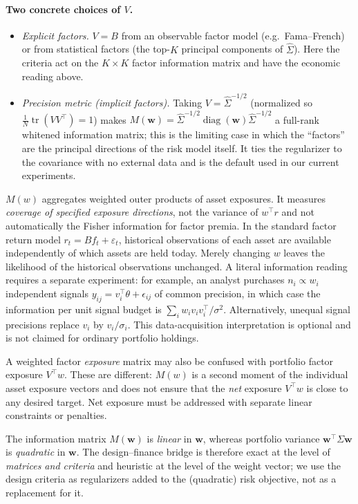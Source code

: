 \documentclass[11pt]{article}
\newcommand{\Sig}{\Sigma}
\newcommand{\Sighat}{\hat\Sigma}
\newcommand{\tr}{\operatorname{tr}}
\newcommand{\diag}{\operatorname{diag}}
\newcommand{\w}{\mathbf{w}}
\newcommand{\M}{M(\w)}
\begin{document}
\paragraph{Two concrete choices of $V$.}
\begin{itemize}[leftmargin=1.4em,itemsep=0.2em]
  \item \emph{Explicit factors.} $V=B$ from an observable factor model
    (e.g.\ Fama--French) or from statistical factors (the top-$K$ principal
    components of $\Sighat$). Here the criteria act on the $K\times K$ factor
    information matrix and have the economic reading above.
  \item \emph{Precision metric (implicit factors).} Taking $V=\Sighat^{-1/2}$
    (normalized so $\tfrac1N\tr(VV^\top)=1$) makes $\M=\Sighat^{-1/2}\diag(\w)\Sighat^{-1/2}$
    a full-rank whitened information matrix; this is the limiting case in which the
    ``factors'' are the principal directions of the risk model itself. It ties the
    regularizer to the covariance with no external data and is the default used in
    our current experiments.
\end{itemize}

$M(w)$ aggregates weighted outer products of asset exposures. It measures \emph{coverage of specified exposure directions}, not the variance of $w^\top r$ and not automatically the Fisher information for factor premia. In the standard factor return model $r_t=Bf_t+\varepsilon_t$, historical observations of each asset are available independently of which assets are held today. Merely changing $w$ leaves the likelihood of the historical observations unchanged. A literal information reading requires a separate experiment: for example, an analyst purchases $n_i\propto w_i$ independent signals $y_{ij}=v_i^\top\theta+\epsilon_{ij}$ of common precision, in which case the information per unit signal budget is $\sum_iw_i v_iv_i^\top/\sigma^2$. Alternatively, unequal signal precisions replace $v_i$ by $v_i/\sigma_i$. This data-acquisition interpretation is optional and is not claimed for ordinary portfolio holdings.

A weighted factor \emph{exposure} matrix may also be confused with portfolio factor exposure $V^\top w$. These are different: $M(w)$ is a second moment of the individual asset exposure vectors and does not ensure that the \emph{net} exposure $V^\top w$ is close to any desired target. Net exposure must be addressed with separate linear constraints or penalties.

The information matrix $\M$ is \emph{linear} in $\w$, whereas portfolio
variance $\w^\top\Sig\w$ is \emph{quadratic} in $\w$. The design--finance bridge
is therefore exact at the level of \emph{matrices and criteria} and heuristic at
the level of the weight vector; we use the design criteria as regularizers added
to the (quadratic) risk objective, not as a replacement for it.
\end{document}
